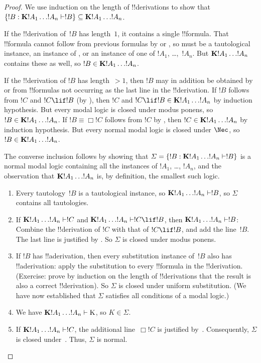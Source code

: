 \documentclass[../../../include/open-logic-section]{subfiles}
\begin{document}
\begin{proof}
  We use induction on the length of !!{derivation}s to show that
  $\Setabs{!B}{\Log{K} !A_1 \dots !A_n \Proves !B} \subseteq
  \Log{K} !A_1 \dots !A_n$.

  If the !!{derivation} of~$!B$ has length~$1$, it contains a single
  !!{formula}. That !!{formula} cannot follow from previous formulas
  by \MP{} or \Nec, so must be a tautological instance, an instance of
  , or an instance
  of one of $!A_1$, \dots,~$!A_n$. But $\Log{K}!A_1\dots!A_n$ contains
  these as well, so $!B \in \Log{K}!A_1 \dots !A_n$.

  If the !!{derivation} of $!B$ has length~$> 1$, then $!B$ may in
  addition be obtained by \MP{} or \Nec{} from !!{formula}s not
  occurring as the last line in the !!{derivation}. If $!B$ follows
  from $!C$ and $!C \lif !B$ (by \MP), then $!C$ and $!C \lif !B \in
  \Log{K}!A_1 \dots !A_n$ by induction hypothesis. But every modal
  logic is closed under modus ponens, so $!B \in \Log{K}!A_1 \dots
  !A_n$. If $!B \equiv \Box !C$ follows from $!C$ by \Nec, then $!C
  \in \Log{K}!A_1 \dots !A_n$ by induction hypothesis. But every
  normal modal logic is closed under $\Nec$, so $!B \in
  \Log{K}!A_1\dots!A_n$.

  The converse inclusion follows by showing that
  $\Sigma = \Setabs{!B}{\Log{K} !A_1 \dots !A_n \Proves !B }$ is a normal
  modal logic containing all the instances of $!A_1$,
  \dots, $!A_n$, and the observation that $\Log{K} !A_1 \dots !A_n$
  is, by definition, the smallest such logic.
  \begin{enumerate}
    \item Every tautology~$!B$ is a tautological instance, so
      $\Log{K}!A_1\dots!A_n \Proves !B$, so $\Sigma$ contains all
      tautologies.
    \item If $\Log{K}!A_1\dots!A_n \Proves !C$ and
      $\Log{K}!A_1\dots!A_n \Proves !C \lif !B$, then
      $\Log{K}!A_1\dots!A_n \Proves !B$: Combine the !!{derivation} of
      $!C$ with that of $!C \lif !B$, and add the line~$!B$. The last
      line is justified by \MP{}. So $\Sigma$ is closed under modus
      ponens.
    \item If $!B$ has !!a{derivation}, then every substitution
      instance of~$!B$ also has !!a{derivation}: apply the substitution
      to every !!{formula} in the !!{derivation}. (Exercise: prove by
      induction on the length of !!{derivation}s that the result is
      also a correct !!{derivation}). So $\Sigma$ is closed under
      uniform substitution. (We have now established that $\Sigma$
      satisfies all conditions of a modal logic.)
    \item We have $\Log{K}!A_1\dots!A_n \Proves \Ax{K}$, so $K \in \Sigma$.
    \item If $\Log{K}!A_1\dots!A_n \Proves !C$, the additional
      line~$\Box !C$ is justified by~\Nec. Consequently, $\Sigma$ is
      closed under~\Nec. Thus, $\Sigma$ is normal.
  \end{enumerate}
\end{proof}
\end{document}
